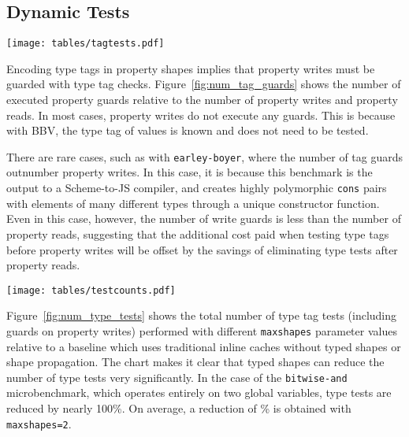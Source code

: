 \documentclass[preprint]{sigplanconf}
\newcommand{\percentstat}[1]{\unskip\%}
\begin{document}
\subsection{Dynamic Tests}

\begin{figure*}[tb]
    \begin{center}
    \texttt{[image: tables/tagtests.pdf]}
    \end{center}
\caption{Number of type tag guards relative to property writes and reads\label{fig:num_tag_guards}}
\end{figure*}

Encoding type tags in property shapes implies that property writes must be
guarded with type tag checks. Figure~\ref{fig:num_tag_guards} shows the
number of executed property guards relative to the number of property writes
and property reads. In most cases, property
writes do not execute any guards. This is because with BBV, the type tag of
values is known and does not need to be tested.

There are rare cases, such as with {\tt earley-boyer}, where the
number of tag guards outnumber property writes. In this case, it is because
this benchmark is the output to a Scheme-to-JS compiler, and creates
highly polymorphic {\tt cons} pairs with elements of many different types
through a unique constructor function. Even in this case, however, the number
of write guards is less than the number of property reads, suggesting
that the additional cost paid when testing type tags before property writes
will be offset by the savings of eliminating type tests after property reads.

\begin{figure*}[tb]
    \begin{center}
    \texttt{[image: tables/testcounts.pdf]}
    \end{center}
\caption{Number of type tests relative to inline cache baseline\label{fig:num_type_tests}}
\end{figure*}

Figure~\ref{fig:num_type_tests} shows the total number of type tag tests
(including guards on property writes) performed with different {\tt maxshapes}
parameter values relative to a baseline which uses traditional inline caches
without typed shapes or shape propagation. The chart makes it clear that typed
shapes can reduce the number of type tests very significantly. In the case of
the {\tt bitwise-and} microbenchmark, which operates entirely on two
global variables, type tests are reduced by nearly 100\%. On average, a
reduction of \percentstat{testcounts_decr_maxshapes2} is obtained with
{\tt maxshapes=2}.
\end{document}
